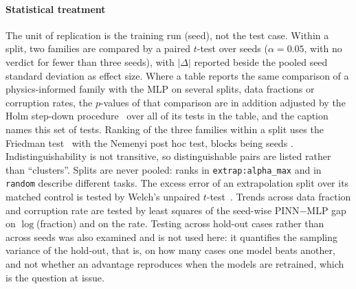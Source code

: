 \documentclass[subscriptcorrection,upint,varvw,barcolor=Goldenrod3,mathalfa=cal=euler,balance,hyphenate,french,pdf-a]{asmejour} %
\begin{document}
\paragraph{Statistical treatment}
The unit of replication is the training run (seed), not the test case. Within a
split, two families are compared by a paired $t$-test over seeds ($\alpha=0.05$,
with no verdict for fewer than three seeds), with $|\Delta|$ reported beside the pooled
seed standard deviation as effect size.
Where a table reports the same comparison of a physics-informed family with the MLP
on several splits, data fractions or corruption rates, the $p$-values of that comparison
are in addition adjusted by the Holm step-down procedure~\citep{holm1979} over all of its
tests in the table, and the caption names this set of tests. %
Ranking of the three families within a split uses the Friedman
test~\citep{friedman1937} with the Nemenyi post hoc test, blocks being seeds
\citep{demsar2006}. Indistinguishability is not
transitive, so distinguishable pairs are listed rather than ``clusters''.
Splits are never pooled: ranks in \texttt{extrap:alpha\_max} and in
\texttt{random} describe different tasks.
The excess error of an extrapolation split over its matched control is tested by
Welch's unpaired $t$-test~\citep{welch1947}. Trends across data fraction and corruption rate are tested by
least squares of the seed-wise PINN$-$MLP gap on $\log$(fraction) and on the rate.
Testing across hold-out cases rather than across seeds was also examined and is not used here:
it quantifies the sampling variance of the hold-out, that is, on how many cases one model beats
another, and not whether an advantage reproduces when the models are retrained, which is the
question at issue.
\end{document}
